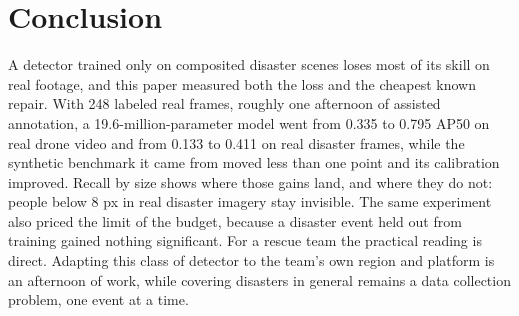 \documentclass[conference,a4paper]{IEEEtran}
\begin{document}
\section{Conclusion}
A detector trained only on composited disaster scenes loses most of its skill on
real footage, and this paper measured both the loss and the cheapest known
repair. With 248 labeled real frames, roughly one afternoon of assisted
annotation, a 19.6-million-parameter model went from 0.335 to 0.795 AP50 on
real drone video and from 0.133 to 0.411 on real disaster frames, while the
synthetic benchmark it came from moved less than one point and its calibration
improved. Recall by size shows where those gains land, and where they do not:
people below 8 px in real disaster imagery stay invisible. The same experiment
also priced the limit of the budget, because a disaster event held out from
training gained nothing significant. For a rescue team the practical reading is
direct. Adapting this class of detector to the team's own region and platform
is an afternoon of work, while covering disasters in general remains a data
collection problem, one event at a time.



\end{document}
